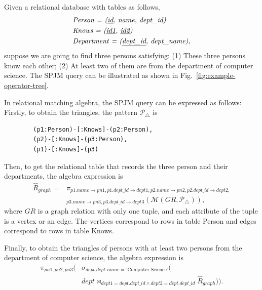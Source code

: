 \begin{example}
    \label{example:framework}
    Given a relational database with tables as follows,
    \begin{equation*}
        \begin{split}
            & \textit{Person = (\underline{id}, name, dept\_id)} \\
            & \textit{Knows = (\underline{id1}, \underline{id2})} \\
            & \textit{Department = (\underline{dept\_id}, dept\_name)}, \\
        \end{split}
    \end{equation*}
    suppose we are going to find three persons satisfying: 
    (1) These three persons know each other;
    (2) At least two of them are from the department of computer science.
    The SPJM query can be illustrated as shown in Fig.~\ref{fig:example-operator-tree}.
    
    In relational matching algebra, the SPJM query can be expressed as follows:
    Firstly, to obtain the triangles, the pattern $\mathcal{P}_{\triangle}$ is
    \begin{lstlisting}
        (p1:Person)-[:Knows]-(p2:Person),
        (p2)-[:Knows]-(p3:Person),
        (p1)-[:Knows]-(p3)
    \end{lstlisting}
    Then, to get the relational table that records the three person and their departments, the algebra expression is 
    \begin{equation*}
        \begin{split}
            \widehat{R}_{graph} = & \pi_{p1.name\rightarrow pn1, p1.dept\_id \rightarrow dept1,p2.name\rightarrow pn2, p2.dept\_id \rightarrow dept2,} \\
            & _{p3.name\rightarrow pn3, p3.dept\_id \rightarrow dept3}(\mathcal{M}(GR, \mathcal{P}_{\triangle})),
        \end{split}
    \end{equation*}
    where $GR$ is a graph relation with only one tuple, and each attribute of the tuple is a vertex or an edge.
    The vertices correspond to rows in table Person and edges correspond to rows in table Knows.

    Finally, to obtain the triangles of persons with at least two persons from the department of computer science, the algebra expression is
    \begin{equation*}
        \begin{split}
        \pi_{pn1, pn2, pn3}
        (& \sigma_{dept.dept\_name = \text{`Computer Science'}}( \\ 
        & dept \Join_{dept1=dept.dept\_id \land dept2=dept.dept\_id} \widehat{R}_{graph})).
        \end{split}
    \end{equation*}


\end{example}
